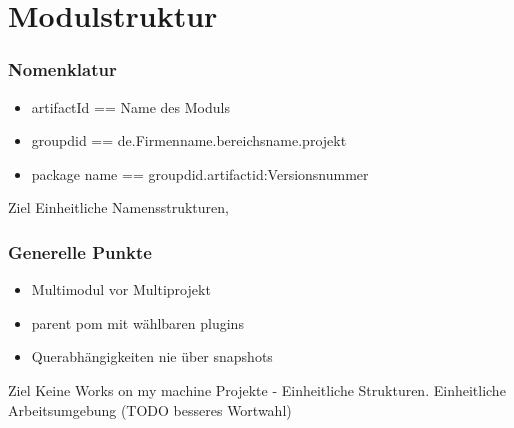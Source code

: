 \section{Modulstruktur}
\begin{frame}
    \frametitle{Nomenklatur}
    \begin{itemize}
    \item artifactId == Name des Moduls
    \item groupdid == de.Firmenname.bereichsname.projekt
      \item package name == groupdid.artifactid:Versionsnummer
    \end{itemize}
    \begin{block}{Ziel}
      Einheitliche Namensstrukturen, 
      \end{block}
  \end{frame}
  \begin{frame}
    \frametitle{Generelle Punkte}
    \begin{itemize}
    \item Multimodul vor Multiprojekt
    \item parent pom mit wählbaren plugins
    \item Querabhängigkeiten nie über snapshots
    \end{itemize}
    \begin{block}{Ziel}
      Keine Works on my machine Projekte - Einheitliche Strukturen. Einheitliche Arbeitsumgebung (TODO besseres Wortwahl)
      \end{block}
  \end{frame}